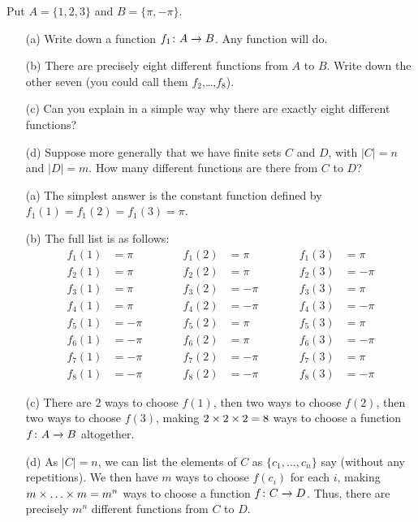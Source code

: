 \documentclass[a4paper]{book}
\theoremstyle{definition}
\newenvironment{starex}{
 \renewcommand{\thetheorem}{\arabic{chapter}.\arabic{section}.\arabic{theorem}${}^*$}
 \exercise
}{\endexercise}
\renewenvironment{solution}{\SolutionInline}{\endSolutionInline}
\begin{document}
\begin{starex}
 Put $A=\{1,2,3\}$ and $B=\{\pi,-\pi\}$.
 \begin{itemize}
  \item[(a)] Write down a function $f_1\colon A\xrightarrow{}B$.  Any function will
   do.
  \item[(b)] There are precisely eight different functions from $A$ to
   $B$.  Write down the other seven (you could call them
   $f_2$,\ldots,$f_8$).
  \item[(c)] Can you explain in a simple way why there are exactly
   eight different functions?
  \item[(d)] Suppose more generally that we have finite sets $C$ and
   $D$, with $|C|=n$ and $|D|=m$.  How many different functions are
   there from $C$ to $D$?
 \end{itemize}
\end{starex}
\begin{solution}
 \begin{itemize}
  \item[(a)] The simplest answer is the constant function defined by
   $f_1(1)=f_1(2)=f_1(3)=\pi$.
  \item[(b)] The full list is as follows:
   \[ \begin{array}{rlcrlcrl}
       f_1(1)&= \pi &\qquad& f_1(2)&= \pi &\qquad& f_1(3)&= \pi \\
       f_2(1)&= \pi &      & f_2(2)&= \pi &      & f_2(3)&=-\pi \\
       f_3(1)&= \pi &      & f_3(2)&=-\pi &      & f_3(3)&= \pi \\
       f_4(1)&= \pi &      & f_4(2)&=-\pi &      & f_4(3)&=-\pi \\
       f_5(1)&=-\pi &      & f_5(2)&= \pi &      & f_5(3)&= \pi \\
       f_6(1)&=-\pi &      & f_6(2)&= \pi &      & f_6(3)&=-\pi \\
       f_7(1)&=-\pi &      & f_7(2)&=-\pi &      & f_7(3)&= \pi \\
       f_8(1)&=-\pi &      & f_8(2)&=-\pi &      & f_8(3)&=-\pi
      \end{array}
   \]
  \item[(c)] There are $2$ ways to choose $f(1)$, then two ways to
   choose $f(2)$, then two ways to choose $f(3)$, making
   $2\times 2\times 2=8$ ways to choose a function $f\colon A\xrightarrow{}B$
   altogether.
  \item[(d)] As $|C|=n$, we can list the elements of $C$ as
   $\{c_1,\ldots,c_n\}$ say (without any repetitions).  We then have
   $m$ ways to choose $f(c_i)$ for each $i$, making
   $m\times\ldots\times m=m^n$ ways to choose a function $f\colon C\xrightarrow{}D$.
   Thus, there are precisely $m^n$ different functions from $C$ to
   $D$.
 \end{itemize}
\end{solution}
\end{document}
